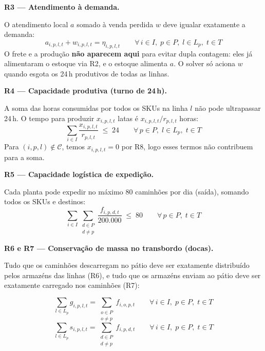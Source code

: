 \documentclass[12pt, a4paper]{article}
\begin{document}
\vspace{8pt}

\begin{mdframed}[style=destaque]
\textbf{\color{ballblue}R3 --- Atendimento \`{a} demanda.}
\medskip

O atendimento local $a$ somado \`{a} venda perdida $w$ deve igualar exatamente a demanda:
\[
  a_{i,p,l,t} + w_{i,p,l,t} = \eta_{i,p,l,t}
  \qquad \forall\, i \in I,\; p \in P,\; l \in L_p,\; t \in T
\]
O frete e a produ\c{c}\~{a}o \textbf{n\~{a}o aparecem aqui} para evitar dupla contagem:
eles j\'{a} alimentaram o estoque via R2, e o estoque alimenta $a$.
O solver s\'{o} aciona $w$ quando esgota os 24\,h produtivos de todas as linhas.
\end{mdframed}

\vspace{8pt}

\begin{mdframed}[style=destaque]
\textbf{\color{ballblue}R4 --- Capacidade produtiva (turno de 24\,h).}
\medskip

A soma das horas consumidas por todos os SKUs na linha $l$ n\~{a}o pode ultrapassar 24\,h.
O tempo para produzir $x_{i,p,l,t}$ latas \'{e} $x_{i,p,l,t} / r_{p,l,t}$ horas:
\[
  \sum_{i \in I} \frac{x_{i,p,l,t}}{r_{p,l,t}} \;\leq\; 24
  \qquad \forall\, p \in P,\; l \in L_p,\; t \in T
\]
Para $(i,p,l) \notin \mathcal{C}$, temos $x_{i,p,l,t} = 0$ por R8, logo esses
termos n\~{a}o contribuem para a soma.
\end{mdframed}

\vspace{8pt}

\begin{mdframed}[style=destaque]
\textbf{\color{ballblue}R5 --- Capacidade log\'{i}stica de expedi\c{c}\~{a}o.}
\medskip

Cada planta pode expedir no m\'{a}ximo 80 caminh\~{o}es por dia (sa\'{i}da),
somando todos os SKUs e destinos:
\[
  \sum_{i \in I} \sum_{\substack{d \in P \\ d \neq p}}
  \frac{f_{i,p,d,t}}{200{.}000} \;\leq\; 80
  \qquad \forall\, p \in P,\; t \in T
\]
\end{mdframed}

\vspace{8pt}

\begin{mdframed}[style=destaque]
\textbf{\color{ballblue}R6 e R7 --- Conserva\c{c}\~{a}o de massa no transbordo (docas).}
\medskip

Tudo que os caminh\~{o}es descarregam no p\'{a}tio deve ser exatamente distribu\'{i}do
pelos armazéns das linhas (R6), e tudo que os armazéns enviam ao p\'{a}tio deve
ser exatamente carregado nos caminh\~{o}es (R7):

\[
  \sum_{l \in L_p} g_{i,p,l,t} = \sum_{\substack{o \in P \\ o \neq p}} f_{i,o,p,t}
  \qquad \forall\, i \in I,\; p \in P,\; t \in T \tag{R6}
\]
\[
  \sum_{l \in L_p} s_{i,p,l,t} = \sum_{\substack{d \in P \\ d \neq p}} f_{i,p,d,t}
  \qquad \forall\, i \in I,\; p \in P,\; t \in T \tag{R7}
\]
\end{mdframed}
\end{document}

